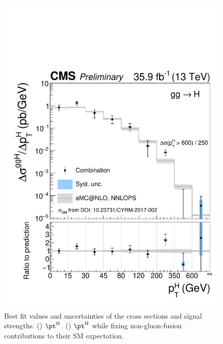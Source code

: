 \begin{figure}[hbtp]
\begin{center}
    \includegraphics[width=\cmsFigWidth]{img/resultsapproval/reworked/spectra_pth_ggH.pdf}
    \caption{
        Best fit values and uncertainties of the cross sections and signal strengths.
        (\cmsLeft) $\pth$.
        (\cmsRight) $\pth$ while fixing non-gluon-fusion contributions to their SM expectation.
        }
    \label{fig:CombinedSpectra_pth}
  \end{center}
\end{figure}

